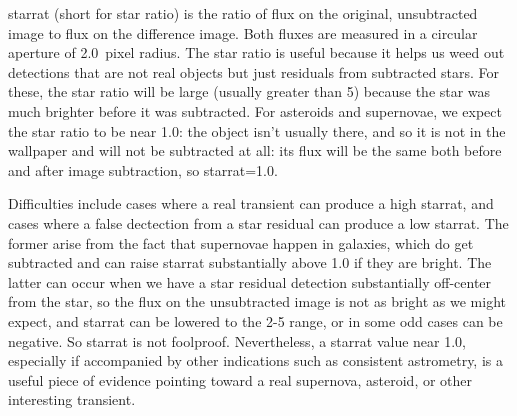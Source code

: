 \documentclass[aps,prb,twocolumn,superscriptaddress]{revtex4-1}
\begin{document}
%
starrat (short for star ratio) is the ratio of flux on the original, 
unsubtracted image to flux on the difference image. Both fluxes are 
measured in a circular aperture of 2.0~pixel radius. The star ratio 
is useful because it helps us weed out detections that are not real 
objects but just residuals from subtracted stars. For these, the star 
ratio will be large (usually greater than 5) because the star was much 
brighter before it was subtracted. For asteroids and supernovae, we 
expect the star ratio to be near 1.0: the object isn't usually there, 
and so it is not in the wallpaper and will not be subtracted at all: 
its flux will be the same both before and after image subtraction, 
so starrat=1.0.

Difficulties include cases where a real transient can produce a high 
starrat, and cases where a false dectection from a star residual can 
produce a low starrat. The former arise from the fact that supernovae 
happen in galaxies, which do get subtracted and can raise starrat 
substantially above 1.0 if they are bright. The latter can occur when 
we have a star residual detection substantially off-center from the 
star, so the flux on the unsubtracted image is not as bright as we might 
expect, and starrat can be lowered to the 2-5 range, or in some odd 
cases can be negative. So starrat is not foolproof. Nevertheless, a 
starrat value near 1.0, especially if accompanied by other indications 
such as consistent astrometry, is a useful piece of evidence pointing 
toward a real supernova, asteroid, or other interesting transient.
\end{document}
